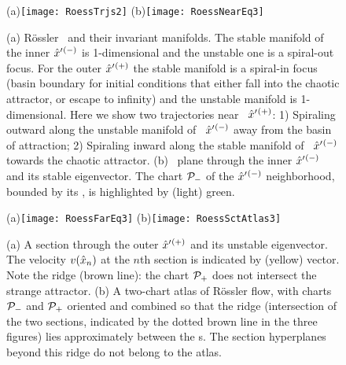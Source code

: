 \documentclass[aip,cha,reprint,
secnumarabic,
nofootinbib, tightenlines,
nobibnotes, showkeys, showpacs,
groupedaddress
]{revtex4-1}
\begin{document}
\begin{figure}
(a)\texttt{[image: RoessTrjs2]}%
(b)\texttt{[image: RoessNearEq3]}
    \caption{
(a)
R\"ossler \eqva\ and their invariant manifolds. The stable manifold of
the inner {\eqv} ${\hat{x}'}{}^{(-)}$  is 1-dimensional and the unstable one
is a spiral-out focus. For the outer {\eqv} ${\hat{x}'}{}^{(+)}$  the stable
manifold is a spiral-in focus (basin boundary for initial conditions that
either fall into the chaotic attractor, or escape to infinity) and the
unstable manifold is 1-dimensional. Here we show two trajectories near
\eqva\ ${\hat{x}'}{}^{(+)}$: 1) Spiraling outward along the unstable
manifold of \eqva\ ${\hat{x}'}{}^{(-)}$ away from the basin of attraction;
2) Spiraling inward along the stable manifold of \eqva\ ${\hat{x}'}{}^{(-)}$
towards the chaotic attractor.
(b)
\PoincSec\ plane through the inner {\eqv} ${\hat{x}'}{}^{(-)}$ and
its stable eigenvector. The chart ${\cal P}_{-}$ of the ${\hat{x}'}{}^{(-)}$
neighborhood, bounded by its \poincBord, is highlighted by (light) green.
    }
\label{fig:RoessTrjs}
\end{figure}

\begin{figure}%
\begin{center}
(a)\texttt{[image: RoessFarEq3]}%
(b)\texttt{[image: RoessSctAtlas3]}
\end{center}
  \caption[R\"ossler section, outer {\eqv}]{
(a)
  A section through the outer {\eqv} ${\hat{x}'}{}^{(+)}$  and its unstable
  eigenvector. The velocity $v(\hat{x}_n)$ at the $n$th section is
  indicated by (yellow) vector. Note the ridge (brown line): the chart ${\cal P}_{+}$
  does not intersect the strange attractor.
(b)
  A two-chart atlas of R\"ossler flow, with charts ${\cal P}_{-}$ and
  ${\cal P}_{+}$ oriented and combined so that the ridge (intersection of
  the two sections, indicated by the dotted brown line in the three figures) lies
  approximately between the \template s. The section hyperplanes
  beyond this ridge do not belong to the atlas.
  } \label{fig:RoessFarEq}
\end{figure}
\end{document}
